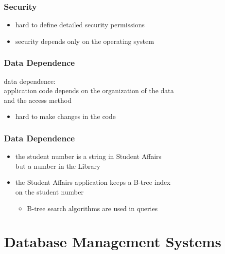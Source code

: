 \documentclass[dvipsnames]{beamer}
\theoremstyle{plain}
\begin{document}
\begin{frame}
  \frametitle{Security}

  \begin{itemize}
    \item hard to define detailed security permissions
    \item security depends only on the operating system
  \end{itemize}
\end{frame}

\begin{frame}
  \frametitle{Data Dependence}

  \begin{definition}
    \alert{data dependence}:\\
      application code depends on the organization of the data\\
      and the access method

    \begin{itemize}
      \item hard to make changes in the code
    \end{itemize}
  \end{definition}
\end{frame}

\begin{frame}
  \frametitle{Data Dependence}

  \begin{example}
    \begin{itemize}
      \item the student number is a string in Student Affairs\\
	but a number in the Library

      \pause
      \item the Student Affairs application keeps a B-tree index\\
	on the student number
      \begin{itemize}
	\item B-tree search algorithms are used in queries
      \end{itemize}
    \end{itemize}
  \end{example}
\end{frame}

\section{Database Management Systems}
\end{document}

